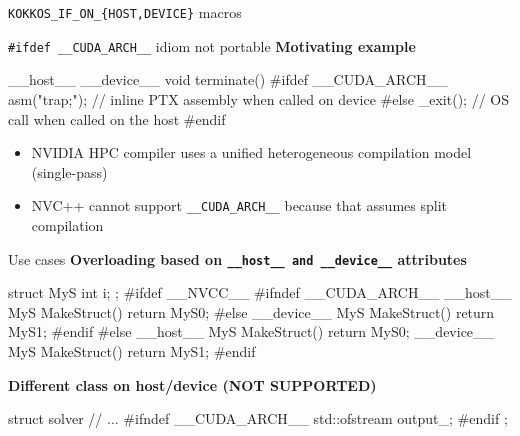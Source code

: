 

\begin{frame}[fragile]

        {\Huge \texttt{KOKKOS\_IF\_ON\_\{HOST,DEVICE\}} macros}

  \vspace{-20pt}

\end{frame}


\begin{frame}[fragile]{\texttt{\#ifdef \_\_CUDA\_ARCH\_\_} idiom not portable}
\textbf{Motivating example}
\begin{code}[keywords={__CUDA_ARCH__}]
__host__ __device__ void terminate() {
#ifdef __CUDA_ARCH__
  asm("trap;");  // inline PTX assembly when called on device
#else
  _exit();       // OS call when called on the host
#endif
}
\end{code}

\begin{itemize}
\item NVIDIA HPC compiler uses a unified heterogeneous compilation model (single-pass)
\item NVC++ cannot support {\color{blue}\texttt{\_\_CUDA\_ARCH\_\_}} because that assumes split compilation
\end{itemize}

\end{frame}


\begin{frame}[fragile]{Use cases}
\textbf{Overloading based on \texttt{\_\_host\_\_ and \_\_device\_\_} attributes}
\begin{code}[keywords={__CUDA_ARCH__}]
struct MyS { int i; };
#ifdef __NVCC__
  #ifndef __CUDA_ARCH__
    __host__ MyS MakeStruct() { return MyS{0};}
  #else
    __device__ MyS MakeStruct() { return MyS{1};}
  #endif
#else
    __host__ MyS MakeStruct() { return MyS{0};}
    __device__ MyS MakeStruct() { return MyS{1};}
#endif
\end{code}

\vspace{10pt}
\textbf{Different class on host/device (NOT SUPPORTED)}
\begin{code}[keywords={__CUDA_ARCH__}]
struct solver {
  // ...
  #ifndef __CUDA_ARCH__
  std::ofstream output_;
  #endif
};
\end{code}

\end{frame}

